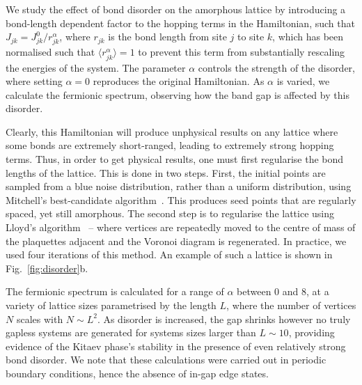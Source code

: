 We study the effect of bond disorder on the amorphous lattice by introducing a bond-length dependent factor to the hopping terms in the Hamiltonian, such that $J_{jk} = J_{jk}^0 / r_{jk}^\alpha$, where $r_{jk}$ is the bond length from site $j$ to site $k$, which has been normalised such that $\langle r_{jk}^\alpha \rangle = 1$ to prevent this term from substantially rescaling the energies of the system. The parameter $\alpha$ controls the strength of the disorder, where setting $\alpha=0$ reproduces the original Hamiltonian. As $\alpha$ is varied, we calculate the fermionic spectrum, observing how the band gap is affected by this disorder. 

Clearly, this Hamiltonian will produce unphysical results on any lattice where some bonds are extremely short-ranged, leading to extremely strong hopping terms. Thus, in order to get physical results, one must first regularise the bond lengths of the lattice. This is done in two steps. First, the initial points are sampled from a blue noise distribution, rather than a uniform distribution, using Mitchell's best-candidate algorithm~\cite{mitchell_spectrally_1991, demofox2_generating_2017}. This produces seed points that are regularly spaced, yet still amorphous. The second step is to regularise the lattice using Lloyd's algorithm~\cite{lloyd_least_1982} -- where vertices are repeatedly moved to the centre of mass of the plaquettes adjacent and the Voronoi diagram is regenerated. In practice, we used four iterations of this method. An example of such a lattice is shown in Fig.~\ref{fig:disorder}b. 

The fermionic spectrum is calculated for a range of $\alpha$ between 0 and 8, at a variety of lattice sizes parametrised by the length $L$, where the number of vertices $N$ scales with $N \sim L^2 $. As disorder is increased, the gap shrinks however no truly gapless systems are generated for systems sizes larger than $L\sim 10$, providing evidence of the Kitaev phase's stability in the presence of even relatively strong bond disorder. We note that these calculations were carried out in periodic boundary conditions, hence the absence of in-gap edge states.

